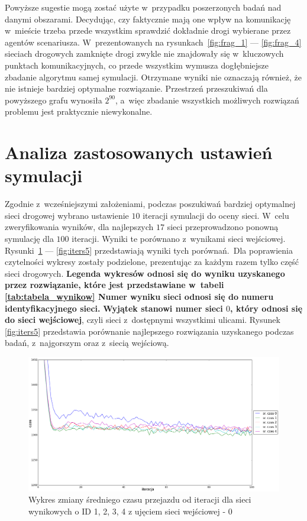 \documentclass[twoside,12pt]{report}
\begin{document}
Powyższe sugestie mogą zostać użyte w~przypadku poszerzonych badań nad danymi obszarami. Decydując, czy faktycznie mają one wpływ na komunikację w~mieście trzeba przede wszystkim sprawdzić dokładnie drogi wybierane przez agentów scenariusza. W~prezentowanych na rysunkach~\ref{fig:frag_1} --- \ref{fig:frag_4} sieciach drogowych zamknięte drogi zwykle nie znajdowały się w~kluczowych punktach komunikacyjnych, co przede wszystkim wymusza dogłębniejsze zbadanie algorytmu samej symulacji. Otrzymane wyniki nie oznaczają również, że nie istnieje bardziej optymalne rozwiązanie. Przestrzeń przeszukiwań dla powyższego grafu wynosiła $2^{90}$, a~więc zbadanie wszystkich możliwych rozwiązań problemu jest praktycznie niewykonalne.

\section{Analiza zastosowanych ustawień symulacji}
Zgodnie z~wcześniejszymi założeniami, podczas poszukiwań bardziej optymalnej sieci drogowej wybrano ustawienie $10$ iteracji symulacji do oceny sieci. W~celu zweryfikowania wyników, dla najlepszych $17$ sieci przeprowadzono ponowną symulację dla $100$ iteracji. Wyniki te porównano z~wynikami sieci wejściowej. Rysunki~\ref{fig:iters1} --- \ref{fig:iters5} przedstawiają wyniki tych porównań.~Dla poprawienia czytelności wykresy zostały podzielone, prezentując za każdym razem tylko część sieci drogowych. \textbf{Legenda wykresów odnosi się do wyniku uzyskanego przez rozwiązanie, które jest przedstawiane w~tabeli \ref{tab:tabela_wynikow} Numer wyniku sieci odnosi się do numeru identyfikacyjnego sieci.} \textbf{Wyjątek stanowi numer sieci $0$, który odnosi się do sieci wejściowej}, czyli sieci z~dostępnymi wszystkimi ulicami. Rysunek \ref{fig:iters5} przedstawia porównanie najlepszego rozwiązania uzyskanego podczas badań, z~najgorszym oraz z~siecią wejściową.

\begin{figure}[htbp]
\centering
\includegraphics[width=1\textwidth]{img/iters/iters1}
\caption{Wykres zmiany średniego czasu przejazdu od iteracji dla sieci wynikowych o ID 1, 2, 3, 4 z ujęciem sieci wejściowej - 0}
\label{fig:iters1}
\end{figure}
\end{document}
